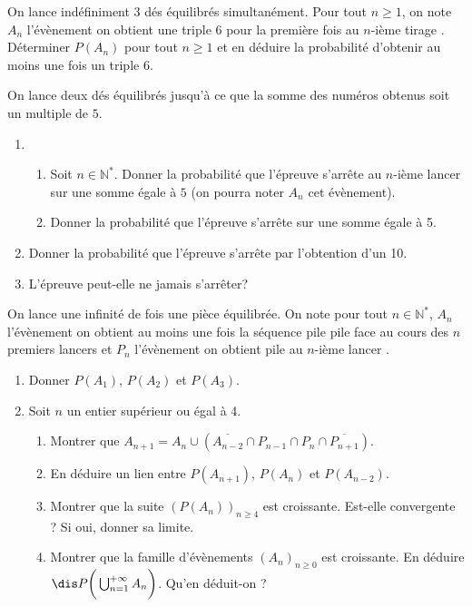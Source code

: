 \documentclass[a4paper,10pt]{report}
\begin{document}
\begin{Exa} On lance indéfiniment 3 dés équilibrés simultanément. Pour tout $n \geq 1$, on note $A_n$ l'évènement \og on obtient une triple 6 pour la première fois au $n$-ième tirage \fg . Déterminer $P(A_n)$ pour tout $n \geq 1$ et en déduire la probabilité d'obtenir au moins une fois un triple $6$.
\end{Exa}



\begin{Exa} On lance deux dés équilibrés jusqu'à ce que la somme des numéros obtenus soit un multiple de $5$. 
\begin{enumerate}
\item 
\begin{enumerate}
\item Soit $n \in \mathbb{N}^*$.  Donner la probabilité que l'épreuve s'arrête au $n$-ième lancer sur une somme égale à $5$ (on pourra noter $A_n$ cet évènement).
\item Donner la probabilité que l'épreuve s'arrête sur une somme égale à 5.
\end{enumerate}
\item Donner la probabilité que l'épreuve s'arrête par l'obtention d'un 10.
\item L'épreuve peut-elle ne jamais s'arrêter?
\end{enumerate}
\end{Exa}


\begin{Exa} On lance une infinité de fois une pièce équilibrée. On note pour tout $n \in \mathbb{N}^*$, $A_n$ l'évènement \og on obtient au moins une fois la séquence pile pile face au cours des $n$ premiers lancers \fg et $P_n$  l'évènement \og on obtient pile au $n$-ième lancer \fg .

\begin{enumerate}
\item Donner $P(A_1)$, $P(A_2)$ et $P(A_3)$.
\item Soit $n$ un entier supérieur ou égal à 4.
\begin{enumerate}
\item Montrer que $A_{n+1} = A_n  \cup (\overline{A_{n-2}} \cap P_{n-1} \cap P_n \cap \overline{P_{n+1}})$.
\item En déduire un lien entre $P(A_{n+1})$, $P(A_n)$ et $P(A_{n-2})$. 
\item Montrer que la suite $(P(A_n))_{n \geq 4}$ est croissante. Est-elle convergente ? Si oui, donner sa limite.
\item Montrer que la famille d'évènements $(A_n)_{n \geq 0}$ est croissante. En déduire $\dis P \bigg{(} \bigcup_{n=1}^{+  \infty} A_n \bigg{)}$. Qu'en déduit-on ?
\end{enumerate}
\end{enumerate}
\end{Exa}
\end{document}

